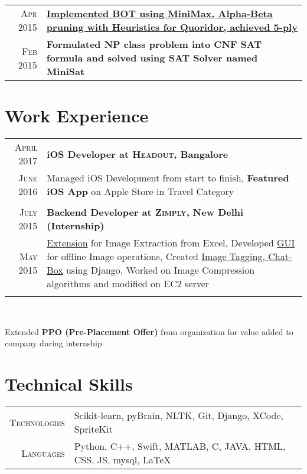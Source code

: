 \documentclass[a4paper,10pt]{article}
\begin{document}
\begin{tabular}{r|p{16cm}}
\textsc{Apr 2015} & \textbf{\href{https://github.com/kautsiitd/Games-and-BOTS}{Implemented BOT using MiniMax, Alpha-Beta pruning with Heuristics for Quoridor, achieved 5-ply}} \\

\textsc{Feb 2015} & \textbf{Formulated NP class problem into CNF SAT formula and solved using SAT Solver named MiniSat} \\

\end{tabular}

\section{Work Experience}
\begin{tabular}{r|p{16cm}}

\textsc{April 2017} & \textbf{iOS Developer at \textsc{Headout}, Bangalore} \\
\textsc{June 2016} & Managed iOS Development from start to finish, \textbf{Featured iOS App} on Apple Store in Travel Category\\
\multicolumn{2}{c}{}\\

\textsc{July 2015} & \textbf{Backend Developer at \textsc{Zimply}, New Delhi (Internship)}\\
\textsc{May 2015} & \href{https://github.com/kautsiitd/Image-Extractor-for-Excel}{Extension} for Image Extraction from Excel, Developed \href{https://github.com/kautsiitd/Image-Optimizer}{GUI} for offline Image operations, Created \href{https://github.com/kautsiitd/Image-Tagging-and-Chat-Box}{Image Tagging, Chat-Box} using Django, Worked on Image Compression algorithms and modified on EC2 server\\
\multicolumn{2}{c}{}\\
\end{tabular}\\
\centerline{Extended \textbf{PPO (Pre-Placement Offer)} from organization for value added to company during internship}

\section{Technical Skills}
\begin{tabular}{r|p{15cm}}
\textsc{Technologies} & Scikit-learn, pyBrain, NLTK, Git,  Django, XCode, SpriteKit\\ 
\textsc{Languages} & Python, C++, Swift, MATLAB, C, JAVA, HTML, CSS, JS, mysql, LaTeX\\
\end{tabular}
\end{document}
